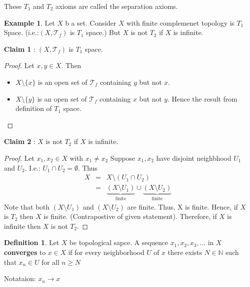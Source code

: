 \documentclass[
]{book}
\providecommand{\tightlist}{%
  \setlength{\itemsep}{0pt}\setlength{\parskip}{0pt}}
\theoremstyle{definition}
\newtheorem{definition}{Definition}[chapter]
\theoremstyle{definition}
\newtheorem{example}{Example}[chapter]
\theoremstyle{definition}
\theoremstyle{definition}
\theoremstyle{remark}
\begin{document}
These \(T_1\) and \(T_2\) axioms are called the separation axioms.

\begin{example}
\protect\hypertarget{exm:unnamed-chunk-73}{}\label{exm:unnamed-chunk-73}Let \(X\) b a set. Consider \(X\) with finite complemenet topology is \(T_1\) Space. (i.e.:\((X,\mathcal{T}_f)\) is \(T_1\) space.) But \(X\) is not \(T_2\) if \(X\) is infinite.
\end{example}

\textbf{Claim 1} : \((X,\mathcal{T}_{f})\) is \(T_1\) space.

\begin{proof}

Let \(x,y\in X\). Then

\begin{itemize}
\tightlist
\item
  \(X\setminus \{x\}\) is an open set of \(\mathcal{T}_{f}\) containing \(y\) but not \(x\).
\item
  \(X\setminus \{y\}\) is an open set of \(\mathcal{T}_{f}\) containing \(x\)
  but not \(y\).
  Hence the result from definition of \(T_1\) space.
\end{itemize}

\end{proof}

\textbf{Claim 2} : \(X\) is not \(T_2\) if \(X\) is infinite.

\begin{proof}
Let \(x_1,x_2\in X\) with \(x_1\neq x_2\) Suppose \(x_1,x_2\) have disjoint neighbhood \(U_1\) and \(U_2\). I.e.: \(U_1\cap U_2=\emptyset\). Thus
\begin{eqnarray}
X &=& X\setminus (U_1\cap U_2)\\
&=& \underbrace{(X \setminus U_1 )}_{\text{finite}} \cup \underbrace{(X\setminus U_2)}_{\text{finite}}
\end{eqnarray}
Note that both \((X \setminus U_1 )\) and \((X \setminus U_2 )\) are finite. Thus, X is finite. Hence, if \(X\) is \(T_2\) then \(X\) is finite. (Contrapostive of given statement). Therefore, if \(X\) is infinite then \(X\) is not \(T_2\).
\end{proof}

\begin{definition}
\protect\hypertarget{def:unnamed-chunk-76}{}\label{def:unnamed-chunk-76}Let \(X\) be topological sapce. A sequence \(x_1,x_2,x_3,...\) in \(X\) \textbf{converges} to \(x\in X\) if for every neighborhood \(U\) of \(x\) there exists \(N\in \mathbb{N}\) such that \(x_n \in U\) for all \(n\geq N\)

Notataion: \(x_n \to x\)
\end{definition}
\end{document}
